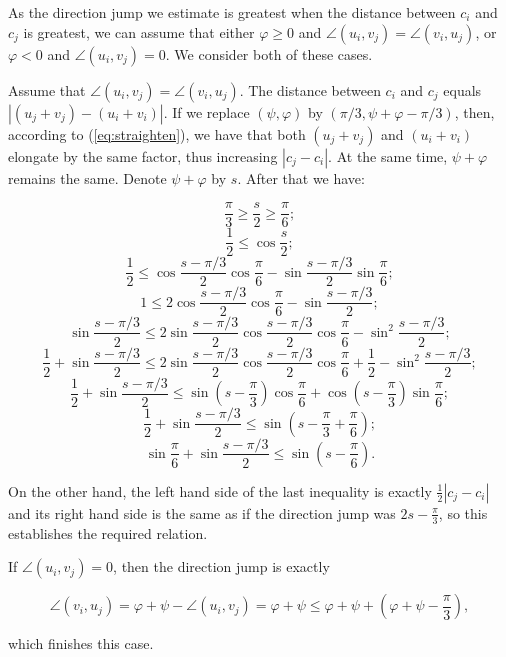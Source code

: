 As the direction jump we estimate is greatest when the distance between $c_i$ and $c_j$ is greatest, we can assume that either $\varphi\geq 0$ and $\angle(u_i, v_j) = \angle(v_i, u_j)$, or $\varphi < 0$ and $\angle(u_i, v_j) = 0$. We consider both of these cases.

Assume that $\angle(u_i, v_j) = \angle(v_i, u_j)$. The distance between $c_i$ and $c_j$ equals $|(u_j + v_j) - (u_i + v_i)|$. If we replace $(\psi, \varphi)$ by $(\pi/3, \psi + \varphi - \pi/3)$, then, according to (\ref{eq:straighten}), we have that both $(u_j + v_j)$ and $(u_i + v_i)$ elongate by the same factor, thus increasing $|c_j - c_i|$. At the same time, $\psi + \varphi$ remains the same. Denote $\psi + \varphi$ by $s$. After that we have:

$$\frac{\pi}{3} \geq \frac{s}{2} \geq\frac{\pi}{6};$$
$$\frac12 \leq \cos\frac{s}{2};$$
$$\frac12 \leq \cos\frac{s - \pi/3}{2}\cos\frac{\pi}{6} - \sin\frac{s - \pi/3}{2}\sin\frac{\pi}{6};$$
$$1 \leq 2\cos\frac{s - \pi/3}{2}\cos\frac{\pi}{6} - \sin\frac{s - \pi/3}{2};$$
$$\sin\frac{s - \pi/3}{2} \leq 2\sin\frac{s - \pi/3}{2}\cos\frac{s - \pi/3}{2}\cos\frac{\pi}{6} - \sin^2\frac{s - \pi/3}{2};$$
$$\frac12 + \sin\frac{s - \pi/3}{2} \leq 2\sin\frac{s - \pi/3}{2}\cos\frac{s - \pi/3}{2}\cos\frac{\pi}{6} + \frac12 - \sin^2\frac{s - \pi/3}{2};$$
$$\frac12 + \sin\frac{s - \pi/3}{2} \leq \sin\left(s - \frac{\pi}{3}\right)\cos\frac{\pi}{6} + \cos\left(s - \frac{\pi}{3}\right)\sin\frac{\pi}{6};$$
$$\frac12 + \sin\frac{s - \pi/3}{2} \leq \sin\left(s - \frac{\pi}{3} + \frac{\pi}{6}\right);$$
$$\sin\frac{\pi}{6} + \sin\frac{s - \pi/3}{2} \leq \sin\left(s - \frac{\pi}{6}\right).$$

On the other hand, the left hand side of the last inequality is exactly $\frac12|c_j - c_i|$ and its right hand side is the same as if the direction jump was $2s - \frac{\pi}{3}$, so this establishes the required relation.

If $\angle(u_i, v_j) = 0$, then the direction jump is exactly

$$\angle(v_i, u_j) = \varphi + \psi - \angle(u_i, v_j) = \varphi + \psi \leq \varphi + \psi + \left(\varphi + \psi - \frac{\pi}{3}\right),$$

which finishes this case.



